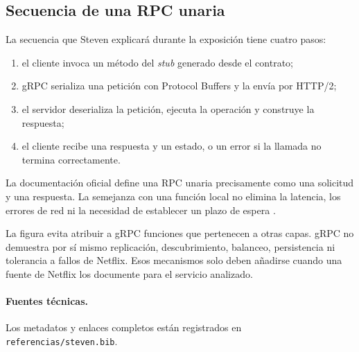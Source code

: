 \subsection{Secuencia de una RPC unaria}
La secuencia que Steven explicará durante la exposición tiene cuatro pasos:
\begin{enumerate}
  \item el cliente invoca un método del \textit{stub} generado desde el contrato;
  \item gRPC serializa una petición con Protocol Buffers y la envía por HTTP/2;
  \item el servidor deserializa la petición, ejecuta la operación y construye la
  respuesta;
  \item el cliente recibe una respuesta y un estado, o un error si la llamada no
  termina correctamente.
\end{enumerate}
La documentación oficial define una RPC unaria precisamente como una solicitud
y una respuesta. La semejanza con una función local no elimina la latencia, los
errores de red ni la necesidad de establecer un plazo de espera
\cite{steven-grpc-core}.

La figura evita atribuir a gRPC funciones que pertenecen a otras capas. gRPC no
demuestra por sí mismo replicación, descubrimiento, balanceo, persistencia ni
tolerancia a fallos de Netflix. Esos mecanismos solo deben añadirse cuando una
fuente de Netflix los documente para el servicio analizado.

\paragraph{Fuentes técnicas.}
Los metadatos y enlaces completos están registrados en
\texttt{referencias/steven.bib}.

